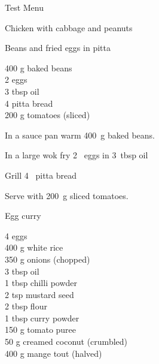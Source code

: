 \begin{menu}{Test Menu}
\begin{recipe}{2}{Chicken with cabbage and peanuts}
\begin{instructions}
    \end{instructions}
    \end{recipe}%
  
    \begin{recipe}{1}{Beans and fried eggs in pitta}%
    
		\begin{ingredients}
		400 g baked beans  \\
	2  eggs  \\
	3 tbsp oil  \\
	4  pitta bread  \\
	200 g tomatoes (sliced) \\
	
		\end{ingredients}
	
    \begin{instructions}
    \item 
        In a sauce pan warm
        400~g  baked beans.
      \item 
        In a large wok fry
        2~  eggs
        in
        3~tbsp  oil\item 
        Grill
        4~  pitta bread\item 
        Serve with 200~g sliced tomatoes.
      
    \end{instructions}
    \end{recipe}%
  
    \begin{recipe}{2}{Egg curry}%
    
		\begin{ingredients}
		4  eggs  \\
	400 g white rice  \\
	350 g onions (chopped) \\
	3 tbsp oil  \\
	1 tbsp chilli powder  \\
	2 tsp mustard seed  \\
	2 tbsp flour  \\
	1 tbsp curry powder  \\
	150 g tomato puree  \\
	50 g creamed coconut (crumbled) \\
	400 g mange tout (halved) \\
	
		\end{ingredients}
	
	

\end{recipe}
\end{menu}
